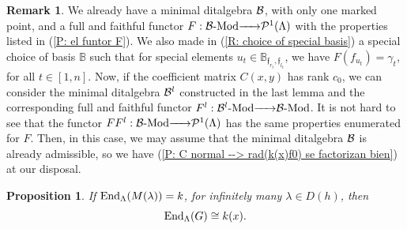 \documentclass{article}
\newtheorem{proposition}[theorem]{Proposition}
\theoremstyle{definition}
\newtheorem{remark}[theorem]{Remark}
\newcommand{\End}{{ \rm End }}
\newcommand{\Mod}{{ \rm Mod }}
\renewcommand{\frak}{\mathfrak}
\newcommand{\g}{\hbox{-}}
\newcommand{\hueca}[1]{\mathbb{#1}}
\newcommand{\rightmap}[1]{\smash{\mathop{\hbox to 
20pt{\rightarrowfill}}\limits^{#1}}}
\begin{document}
\begin{remark} We already have a minimal ditalgebra ${\cal B}$, with only one marked point, and a full and faithful functor $F:{\cal B}\g\Mod\rightmap{}{\cal P}^1(\Lambda)$ with the properties listed in (\ref{P: el funtor F}). We also made in (\ref{R: choice of special basis}) a special choice of basis $\hueca{B}$ such that for special elements $u_t\in \hueca{B}_{\frak{f}_{r_t},\frak{f}_{l_t}}$, we have $F(f_{u_t})=\gamma_t$, for all $t\in [1,n]$.
 Now, if the coefficient matrix $C(x,y)$ has rank $c_0$, we can consider the minimal ditalgebra ${\cal B}^l$ constructed in the last lemma and the corresponding full and faithful functor $F^l:{\cal B}^l\g\Mod\rightmap{}{\cal B}\g\Mod$. It is not hard to see that the functor  $FF^l:{\cal B}\g\Mod\rightmap{}{\cal P}^1(\Lambda)$ has the same properties enumerated for $F$. Then, in this case, we may assume that the minimal ditalgebra ${\cal B}$ is already admissible, so we have  (\ref{P: C normal --> rad(k(x)f0) se factorizan bien}) at our disposal.   
\end{remark}

\begin{proposition}\label{P: el resto del main thm} If $\End_\Lambda(M(\lambda))=k$, for infinitely many $\lambda\in D(h)$, then 
$$\End_\Lambda(G)\cong k(x).$$ 
\end{proposition}
\end{document}
